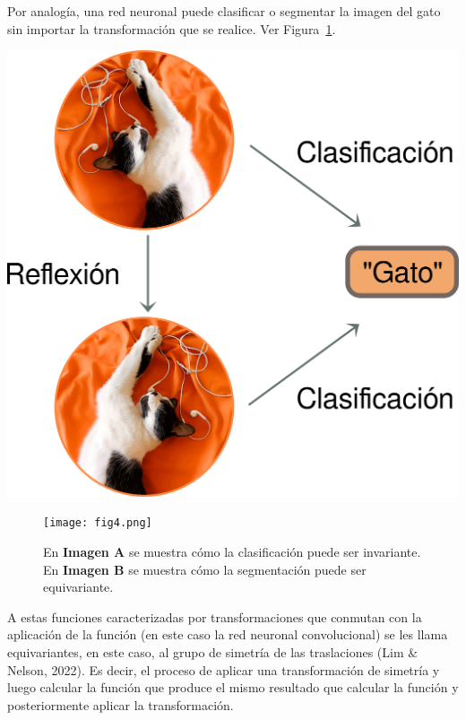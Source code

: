 \documentclass[12pt,letterpaper,final, openany]{scrbook}
\begin{document}
Por analogía, una red neuronal puede clasificar o segmentar la imagen del gato sin importar la transformación que se realice. Ver Figura~\ref{fig:cat_segmentation}.
\begin{center}
\includegraphics[scale=0.1]{fig2.png}
\end{center}

\begin{figure}[h!]
    \centering
    \texttt{[image: fig4.png]}
    \caption{En \textbf{Imagen A} se muestra cómo la clasificación puede ser invariante.
    En \textbf{Imagen B} se muestra cómo la segmentación puede ser equivariante.}
    \label{fig:cat_segmentation}
\end{figure}

A estas funciones caracterizadas por transformaciones que conmutan con la aplicación de la función (en este caso la red neuronal convolucional) se les llama equivariantes, en este caso, al grupo de simetría de las traslaciones (Lim \& Nelson, 2022). Es decir, el proceso de aplicar una transformación de simetría y luego calcular la función que produce el mismo resultado que calcular la función y posteriormente aplicar la transformación.
\end{document}
